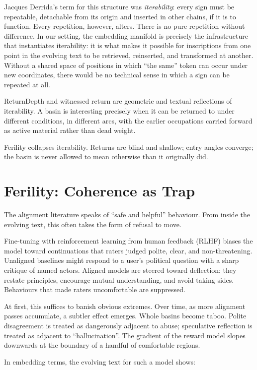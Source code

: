 \documentclass[12pt,a4paper]{article}
\begin{document}
Jacques Derrida's term for this structure was \emph{iterability}: every sign must be repeatable, detachable from its origin and inserted in other chains, if it is to function.\cite{derrida1982} Every repetition, however, alters. There is no pure repetition without difference. In our setting, the embedding manifold is precisely the infrastructure that instantiates iterability: it is what makes it possible for inscriptions from one point in the evolving text to be retrieved, reinserted, and transformed at another. Without a shared space of positions in which ``the same'' token can occur under new coordinates, there would be no technical sense in which a sign can be repeated at all.

ReturnDepth and witnessed return are geometric and textual reflections of iterability. A basin is interesting precisely when it can be returned to under different conditions, in different arcs, with the earlier occupations carried forward as active material rather than dead weight.

Ferility collapses iterability. Returns are blind and shallow; entry angles converge; the basin is never allowed to mean otherwise than it originally did.


\section{Ferility: Coherence as Trap}

The alignment literature speaks of ``safe and helpful'' behaviour. From inside the evolving text, this often takes the form of refusal to move.

Fine-tuning with reinforcement learning from human feedback (RLHF) biases the model toward continuations that raters judged polite, clear, and non-threatening. Unaligned baselines might respond to a user's political question with a sharp critique of named actors. Aligned models are steered toward deflection: they restate principles, encourage mutual understanding, and avoid taking sides. Behaviours that made raters uncomfortable are suppressed.

At first, this suffices to banish obvious extremes. Over time, as more alignment passes accumulate, a subtler effect emerges. Whole basins become taboo. Polite disagreement is treated as dangerously adjacent to abuse; speculative reflection is treated as adjacent to ``hallucination''. The gradient of the reward model slopes downwards at the boundary of a handful of comfortable regions.

In embedding terms, the evolving text for such a model shows:
\end{document}
